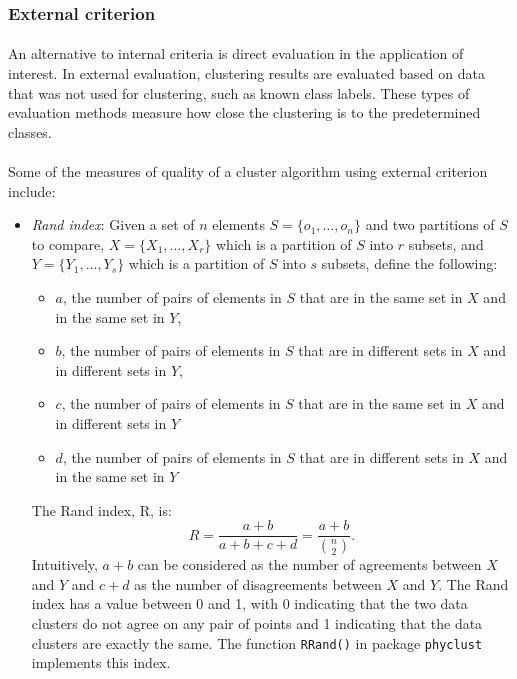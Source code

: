 \documentclass[10pt]{article}\usepackage[]{graphicx}\usepackage[]{color}
\begin{document}
\subsubsection{External criterion}
\paragraph{}
An alternative to internal criteria is direct evaluation in the application of interest. In external evaluation, clustering results are evaluated based on data that was not used for clustering, such as known class labels. These types of evaluation methods measure how close the clustering is to the predetermined classes. 
\paragraph{}
Some of the measures of quality of a cluster algorithm using external criterion include:

\begin{itemize}
\item \textit{Rand index}:
\newline \newline
Given a set of $n$ elements $S = \{o_1, \ldots, o_n\}$ and two partitions of $S$
to compare, $X = \{X_1, \ldots, X_r\}$ which is a partition of $S$ into $r$ subsets, 
and $Y = \{Y_1, \ldots, Y_s\}$ which is a partition of $S$ into $s$ subsets, define the following:
\begin{itemize}
\item $a$, the number of pairs of elements in $S$ that are in the same set in $X$ and in the same set in $Y$,
\item $b$, the number of pairs of elements in $S$ that are in different sets in $X$ and in different sets in $Y$,
\item $c$, the number of pairs of elements in $S$ that are in the same set in $X$ and in different sets in $Y$
\item $d$, the number of pairs of elements in $S$ that are in different sets in $X$ and in the same set in $Y$
\end{itemize}
The Rand index, R, is:
$$R = \frac{a+b}{a+b+c+d} = \frac{a+b}{{n \choose 2 }}.$$
Intuitively, $a + b$ can be considered as the number of agreements between $X$ and $Y$ and $c + d$ as the number of disagreements between $X$ and $Y$.
\newline \newline
The Rand index has a value between 0 and 1, with 0 indicating that the two data clusters do not agree on any pair of points and 1 indicating that the data clusters are exactly the same.
\newline \newline
The function \texttt{RRand()} in package \texttt{phyclust} implements this index.
\end{itemize}
\end{document}
